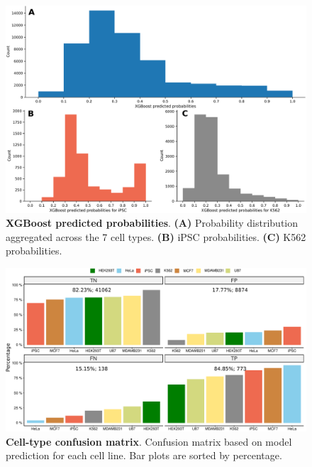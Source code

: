 \begin{figure}[ht!]
  \centering
  \includegraphics[scale=0.4]{plots/appendix/ml/xgboost.predict.prob.pdf}
  \caption[XGBoost predicted probabilities]{\textbf{XGBoost predicted probabilities}. \textbf{(A)} Probability distribution aggregated across the 7 cell types. \textbf{(B)} iPSC probabilities. \textbf{(C)} K562 probabilities.}
  \label{supp-fig:xgb-prob}
\end{figure}

\begin{figure}[ht!]
  \centering
  \includegraphics[scale=0.65]{plots/appendix/ml/cm.for.cell.pdf}
  \caption[Cell-type confusion matrix]{\textbf{Cell-type confusion matrix}. Confusion matrix based on model prediction for each cell line. Bar plots are sorted by percentage.}
  \label{supp-fig:cm-cell}
\end{figure}

